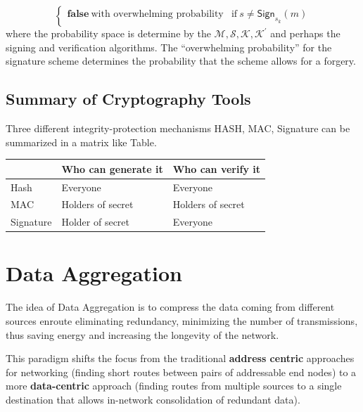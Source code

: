 \documentclass[%
  slidesonly,%
  semlayer%
  ]{seminar}                                  %
\begin{document}
\begin{slide}
\begin{equation}
\begin{cases}
       \textbf{false}\ \mbox{with overwhelming probability} & \mbox{if}\ s \neq \textsf{Sign}_{s_{k}}(m)
      \end{cases}
      \label{eq:verification}
    \end{equation}
    where the probability space is determine by the $\mathcal {M, S, K, K^{'}}$ and perhaps the signing and verification algorithms.
    The ``overwhelming probability'' for the signature scheme determines the probability that the scheme allows for a forgery.
    \vfill
    \clearpage

  \subsection*{Summary of Cryptography Tools}
    \vfill
    Three different integrity-protection mechanisms HASH, MAC, Signature can be summarized in a matrix like Table.
    \begin{table}[!htb]
      \tiny
      \begin{center}
        \begin{tabular}{ |l || l| l| }
          \hline
           & Who can generate it & Who can verify it \\
          \hline
          \hline
          Hash & Everyone & Everyone \\ 
          \hline
          MAC & Holders of secret & Holders of secret \\
          \hline
          Signature & Holder of secret & Everyone \\
          \hline
        \end{tabular}
      \end{center}
    \end{table}
    \vfill
    \clearpage

\section*{Data Aggregation}
  \vfill
  The idea of Data Aggregation is to compress the data coming from different sources enroute eliminating redundancy, minimizing the number of transmissions, thus saving energy and increasing the longevity of the network.

  This paradigm shifts the focus from the traditional \textbf{address centric} approaches for networking (finding short routes between pairs of addressable end nodes) to a more \textbf{data-centric} approach (finding routes from multiple sources to a single destination that allows in-network consolidation of redundant data).
  \vfill
  \clearpage


\end{slide}
\end{document}
